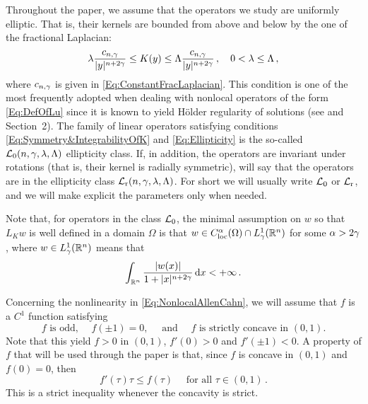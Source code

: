 Throughout the paper, we assume that the operators we study are uniformly elliptic. That is, their kernels are bounded from above and below by the one of the fractional Laplacian:
\begin{equation}
\label{Eq:Ellipticity}
\lambda\dfrac{c_{n,\gamma}}{|y|^{n+2\gamma}} \leq K(y) \leq \Lambda \dfrac{c_{n,\gamma}}{|y|^{n+2\gamma}}\,, \quad 0< \lambda \leq \Lambda \,,
\end{equation}
where $c_{n,\gamma}$ is given in \eqref{Eq:ConstantFracLaplacian}. This condition is one of the most frequently adopted when dealing with nonlocal operators of the form \eqref{Eq:DefOfLu} since it is known to yield Hölder regularity of solutions (see \cite{RosOton-Survey,SerraC2s+alphaRegularity} and Section~2). The family of linear operators satisfying conditions \eqref{Eq:Symmetry&IntegrabilityOfK} and \eqref{Eq:Ellipticity} is the so-called $\mathcal{L}_0(n,\gamma,\lambda, \Lambda)$ ellipticity class. If, in addition, the operators are invariant under rotations (that is, their kernel is radially symmetric), will say that the operators are in the ellipticity class $\mathcal{L}_{\mathrm{r}}(n,\gamma,\lambda, \Lambda)$. For short we will usually write $\mathcal{L}_0$ or $\mathcal{L}_{\mathrm{r}}$, and we will make explicit the parameters only when needed.

Note that, for operators in the class $\mathcal{L}_0$, the minimal assumption on $w$ so that $L_K w$ is well defined in a domain $\Omega$ is that $w\in C^\alpha_{\mathrm{loc}} (\Omega)\cap L^1_\gamma(\mathbb{R}^n)$ for some $\alpha > 2\gamma$, where $w\in L^1_\gamma(\mathbb{R}^n)$ means that
$$
\int_{\mathbb{R}^n} \dfrac{|w(x)|}{1+|x|^{n+2\gamma}}\,\mathrm{d} x < +\infty\,.
$$


Concerning the nonlinearity in \eqref{Eq:NonlocalAllenCahn}, we will assume that $f$ is a $C^1$ function satisfying
\begin{equation}
\label{Eq:Hypothesesf}
f \textrm{ is odd, } \quad f(\pm 1)=0, \quad \text{ and } \quad f \textrm{ is strictly concave in }  (0,1).
\end{equation}
Note that this yield $f>0$ in $(0,1)$, $f'(0)>0$ and $f'(\pm 1) < 0$. A property of $f$ that will be used through the paper is that, since $f$ is concave in $(0,1)$ and $f(0)=0$, then 
\begin{equation}
\label{Eq:PropertyConcavityf}
f'(\tau)\tau \leq f(\tau) \quad \textrm{ for all } \tau \in (0,1)\,.
\end{equation}
This is a strict inequality whenever the concavity is strict.


